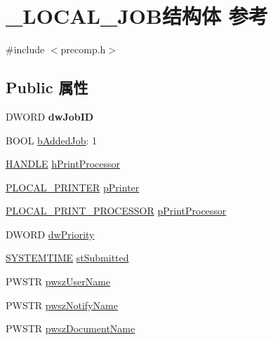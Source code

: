 \hypertarget{struct___l_o_c_a_l___j_o_b}{}\section{\+\_\+\+L\+O\+C\+A\+L\+\_\+\+J\+O\+B结构体 参考}
\label{struct___l_o_c_a_l___j_o_b}


{\ttfamily \#include $<$precomp.\+h$>$}

\subsection*{Public 属性}
\begin{DoxyCompactItemize}
\item 
\mbox{\label{struct___l_o_c_a_l___j_o_b_a51d9d8e73a22932ef7a1d598968ab999}} 
D\+W\+O\+RD {\bfseries dw\+Job\+ID}
\item 
B\+O\+OL \hyperlink{struct___l_o_c_a_l___j_o_b_aa3891375c0b26c20d616764c71e3f64b}{b\+Added\+Job}\+: 1
\item 
\hyperlink{interfacevoid}{H\+A\+N\+D\+LE} \hyperlink{struct___l_o_c_a_l___j_o_b_a1cc4940f22917b3dd69149a21c1efbf3}{h\+Print\+Processor}
\item 
\hyperlink{struct___l_o_c_a_l___p_r_i_n_t_e_r}{P\+L\+O\+C\+A\+L\+\_\+\+P\+R\+I\+N\+T\+ER} \hyperlink{struct___l_o_c_a_l___j_o_b_a70654959e93b2a0b771c301d419f79ad}{p\+Printer}
\item 
\hyperlink{struct___l_o_c_a_l___p_r_i_n_t___p_r_o_c_e_s_s_o_r}{P\+L\+O\+C\+A\+L\+\_\+\+P\+R\+I\+N\+T\+\_\+\+P\+R\+O\+C\+E\+S\+S\+OR} \hyperlink{struct___l_o_c_a_l___j_o_b_a8bdcc78093b5901b6017a1da84f562d8}{p\+Print\+Processor}
\item 
D\+W\+O\+RD \hyperlink{struct___l_o_c_a_l___j_o_b_a01689f69c87ade5740c633c79e64acb7}{dw\+Priority}
\item 
\hyperlink{struct___s_y_s_t_e_m_t_i_m_e}{S\+Y\+S\+T\+E\+M\+T\+I\+ME} \hyperlink{struct___l_o_c_a_l___j_o_b_a2b28271c1a0d56ade39511cd06762173}{st\+Submitted}
\item 
P\+W\+S\+TR \hyperlink{struct___l_o_c_a_l___j_o_b_abb0a19c78f6bef9b08bd4cba2a4fe4ba}{pwsz\+User\+Name}
\item 
P\+W\+S\+TR \hyperlink{struct___l_o_c_a_l___j_o_b_abf28a821388d2626e17bde00baf193cd}{pwsz\+Notify\+Name}
\item 
P\+W\+S\+TR \hyperlink{struct___l_o_c_a_l___j_o_b_ad6730e65cbd770dec71450a75daa27e9}{pwsz\+Document\+Name}

\end{DoxyCompactItemize}
